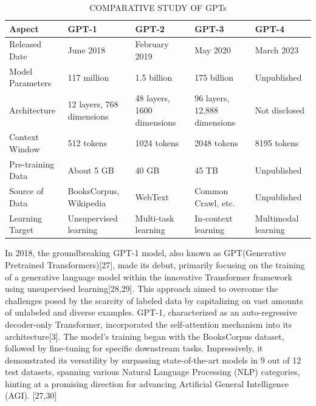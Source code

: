 \documentclass[conference]{IEEEtran}
\begin{document}
\begin{table}[htbp]
    \centering
    \caption{COMPARATIVE STUDY OF GPTs}
    \begin{center}
    \setlength{\extrarowheight}{2pt} 
    \begin{tabular}{|m{3cm}|m{3cm}|m{3cm}|m{3cm}|m{3cm}|}
        \hline
\center
        \textbf{Aspect} & \textbf{GPT-1} & \textbf{GPT-2} & \textbf{GPT-3} & \textbf{GPT-4} \\
        \hline
\center
        Released Date & June 2018 & February 2019 & May 2020 & March 2023 \\
        \hline
\center
        Model Parameters & 117 million & 1.5 billion & 175 billion & Unpublished \\
        \hline
\center
        Architecture & 12 layers, 768 dimensions & 48 layers, 1600 dimensions & 96 layers, 12,888 dimensions & Not disclosed \\
        \hline
\center
        Context Window & 512 tokens & 1024 tokens & 2048 tokens & 8195 tokens \\
        \hline
\center
        Pre-training Data & About 5 GB & 40 GB & 45 TB & Unpublished \\
        \hline
\center
        Source of Data & BooksCorpus, Wikipedia & WebText & Common Crawl, etc. & Unpublished \\
        \hline
\center
        Learning Target & Unsupervised learning & Multi-task learning & In-context learning & Multimodal learning \\
        \hline
    \end{tabular}
    \label{tab1}
    \end{center}
\end{table}

In 2018, the groundbreaking GPT-1 model, also known as GPT(Generative Pretrained Transformers)[27], made its debut, primarily focusing on the training of a generative language model within the innovative Transformer framework using unsupervised learning[28,29]. This approach aimed to overcome the challenges posed by the scarcity of labeled data by capitalizing on vast amounts of unlabeled and diverse examples. GPT-1, characterized as an auto-regressive decoder-only Transformer, incorporated the self-attention mechanism into its architecture[3]. The model's training began with the BooksCorpus dataset, followed by fine-tuning for specific downstream tasks. Impressively, it demonstrated its versatility by surpassing state-of-the-art models in 9 out of 12 test datasets, spanning various Natural Language Processing (NLP) categories, hinting at a promising direction for advancing Artificial General Intelligence (AGI). [27,30]
\end{document}
